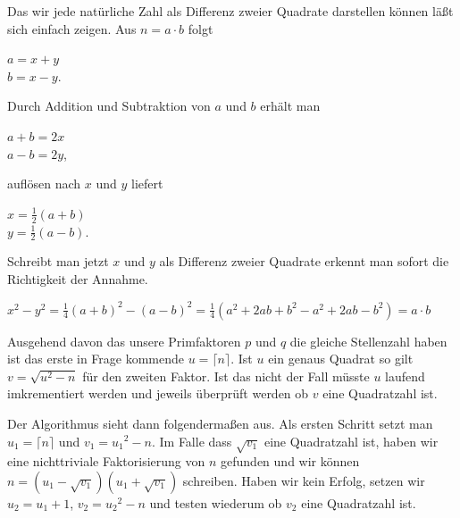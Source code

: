 \documentclass[10pt, bigheadings]{scrartcl}
\begin{document}
Das wir jede natürliche Zahl als Differenz zweier Quadrate darstellen können
läßt sich einfach zeigen. Aus $n = a\cdot b$ folgt
\begin{center}
$ a = x + y$\\
$ b = x - y$.
\end{center}
Durch Addition und Subtraktion von $a$ und $b$ erhält man
\begin{center}
$ a+b = 2x$\\
$ a-b = 2y$,
\end{center}
auflösen nach $x$ und $y$ liefert
\begin{center}
$ x = \frac{1}{2}(a+b)$\\
$ y = \frac{1}{2}(a-b)$.
\end{center}
Schreibt man jetzt $x$ und $y$ als Differenz zweier Quadrate erkennt man
sofort die Richtigkeit der Annahme.
\begin{center}
$x^2-y^2 = \frac{1}{4}(a+b)^2-(a-b)^2 = \frac{1}{4}(a^2+2ab+b^2-a^2+2ab-b^2) = a\cdot b$
\end{center}

Ausgehend davon das unsere Primfaktoren $p$ und $q$ die gleiche
Stellenzahl haben ist das erste in Frage kommende $u = \lceil n \rceil$.
Ist $u$ ein genaus Quadrat so gilt $v = \sqrt{u^2 - n}$ für den
zweiten Faktor. Ist das nicht der Fall müsste $u$ laufend imkrementiert
werden und jeweils überprüft werden ob $v$ eine Quadratzahl ist.

Der Algorithmus sieht dann folgendermaßen aus. Als ersten Schritt setzt man
$u_1 = \lceil n \rceil$ und $v_1 = {u_1}^2 - n$. Im Falle dass $\sqrt{v_1}$ eine
Quadratzahl ist, haben wir eine nichttriviale Faktorisierung von $n$
gefunden und wir können $n = (u_1 - \sqrt{v_1})(u_1 + \sqrt{v_1})$ schreiben.
Haben wir kein Erfolg, setzen wir $u_2 = u_1 + 1$, $v_2 = {u_2}^2 - n$
und testen wiederum ob $v_2$ eine Quadratzahl ist.
\end{document}
